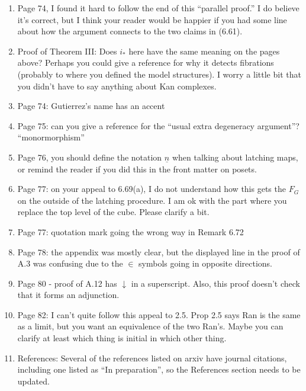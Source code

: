 \documentclass{article}
\begin{document}
\begin{enumerate}
	\item
	Page 74, I found it hard to follow the end of this ``parallel proof.'' I do believe it's correct, but I think your reader would be happier if you had some line about how the argument connects to the two claims in (6.61).
	
	\item
	Proof of Theorem III: Does $i_*$ here have the same meaning on the pages above? Perhaps you could give a reference for why it detects fibrations (probably to where you defined the model structures). I worry a little bit that you didn't have to say anything about Kan complexes.
	
	\item
	Page 74: Gutierrez's name has an accent
	
	\item
	Page 75: can you give a reference for the ``usual extra degeneracy argument''?
	``monormorphism''
	
	\item
	Page 76, you should define the notation $\underline{n}$ when talking about latching maps, or remind the reader if you did this in the front matter on posets.
	
	\item
	Page 77: on your appeal to 6.69(a), I do not understand how this gets the $F_G$ on the outside of the latching procedure. I am ok with the part where you replace the top level of the cube. Please clarify a bit.
	
	\item
	Page 77: quotation mark going the wrong way in Remark 6.72
	
	\item
	Page 78: the appendix was mostly clear, but the displayed line in the proof of A.3 was confusing due to the $\in$ symbols going in opposite directions.
	
	\item
	Page 80 - proof of A.12 has $\downarrow$ in a superscript. Also, this proof doesn't check that it forms an adjunction.
	
	\item
	Page 82: I can't quite follow this appeal to 2.5. Prop 2.5 says Ran is the same as a limit, but you want an equivalence of the two Ran's. Maybe you can clarify at least which thing is initial in which other thing. 
	
	\item
	References:
	Several of the references listed on arxiv have journal citations, including one listed as ``In preparation'', so the References section needs to be updated.
\end{enumerate}







{}


\end{document}
